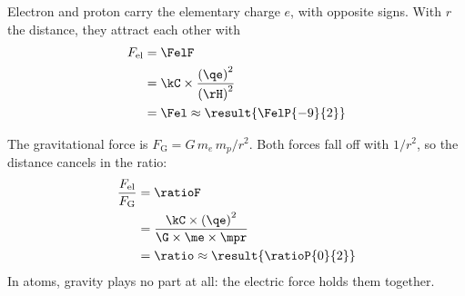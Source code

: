 \begin{abcliste}
\abc Electron and proton carry the elementary charge $e$, with opposite signs. With $r$ the distance, they attract each other with
\begin{align}
 F_\mathrm{el} &= \FelF \\
   &= \kC\times\frac{\left(\qe\right)^2}{\left(\rH\right)^2} \\
   &= \Fel \approx \result{\FelP{-9}{2}}
\end{align}

\abc The gravitational force is $F_\mathrm{G} = G\,m_e\,m_p/r^2$. Both forces fall off with $1/r^2$, so the distance cancels in the ratio:
\begin{align}
 \frac{F_\mathrm{el}}{F_\mathrm{G}} &= \ratioF \\
   &= \frac{\kC\times\left(\qe\right)^2}{\G\times\me\times\mpr} \\
   &= \ratio \approx \result{\ratioP{0}{2}}
\end{align}
In atoms, gravity plays no part at all: the electric force holds them together.
\end{abcliste}
